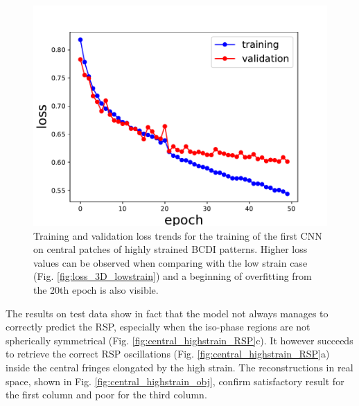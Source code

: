 \begin{figure}[H]
    \centering
    \includegraphics[width=\textwidth]{figures/Phasing/loss_central_patch_highstrain.pdf}
    \caption{Training and validation loss trends for the training of the first CNN on central patches of highly strained BCDI 
    patterns. Higher loss values can be observed when comparing with the low strain case (Fig. \ref{fig:loss_3D_lowstrain}) and a 
    beginning of overfitting from the 20th epoch is also visible. }
    \label{fig:loss_central_highstrain}
\end{figure}

The results on test data show in fact that the model not always manages to correctly predict the RSP, especially when the 
iso-phase regions are not spherically symmetrical (Fig. \ref{fig:central_highstrain_RSP}c). It however succeeds to 
retrieve the correct RSP oscillations (Fig. \ref{fig:central_highstrain_RSP}a) inside the central fringes elongated by the
high strain. The reconstructions in real space, shown in Fig. \ref{fig:central_highstrain_obj}, confirm satisfactory 
result for the first column and poor for the third column. 

